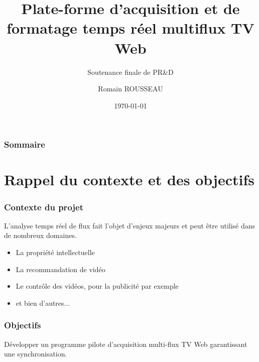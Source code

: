 \documentclass{beamer}
\begin{document}
\AtBeginSection[]{
	
	\begin{frame}
	
	\tableofcontents[currentsection]
	
	\end{frame} 

}

\title[Plate-forme d'acquisition multiflux TV Web]{Plate-forme d'acquisition et de formatage temps réel multiflux TV Web}
\subtitle{Soutenance finale de PR\&D}
\author{Romain ROUSSEAU}
\date{\today}

\begin{frame}[plain]
	\maketitle
\end{frame}

\begin{frame}

\frametitle{Sommaire}

\tableofcontents


\end{frame}




\section[Contexte et objectifs]{Rappel du contexte et des objectifs}

\begin{frame}
\frametitle{Contexte du projet}

L'analyse temps réel de flux fait l'objet d'enjeux majeurs et peut être utilisé dans de nombreux domaines.

\begin{itemize}
	\item La propriété intellectuelle
	\item La recommandation de vidéo
	\item Le contrôle des vidéos, pour la publicité par exemple
	\item et bien d'autres...
\end{itemize}

\end{frame}

\begin{frame}
\frametitle{Objectifs}

Développer un programme pilote d'acquisition multi-flux TV Web garantissant une synchronisation.

\end{frame}
\end{document}
